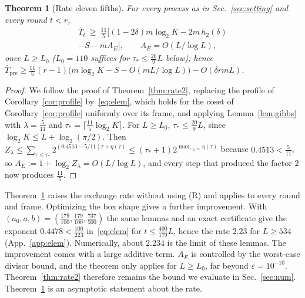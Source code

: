 \documentclass[aps,prx,twocolumn,superscriptaddress,nofootinbib,longbibliography]{revtex4-2}
\theoremstyle{plain}
\newtheorem{theorem}{Theorem}
\theoremstyle{definition}
\theoremstyle{remark}
\newcommand{\Tpre}{T_{\mathrm{pre}}}
\begin{document}
\begin{theorem}[Rate eleven fifths]\label{thm:rate115}
For every process as in Sec.~\ref{sec:setting} and every round $t<r$,
\begin{multline}\label{eq:rate115}
\bar T_t\ \ge\ \tfrac{11}5\big[(1-2\delta)m\log_2K-2m\,h_2(\delta)\\-S-mA_E\big],\qquad A_E=O(L/\log L),
\end{multline}
once $L\ge L_0$ ($L_0=110$ suffices for $\tau_*\le\tfrac{20}9L$ below); hence $\bar\Tpre\ge\tfrac{11}5(r-1)\big(m\log_2K-S-O(mL/\log L)\big)-O(\delta rmL)$.
\end{theorem}
\begin{proof}
We follow the proof of Theorem~\ref{thm:rate2}, replacing the profile of Corollary~\ref{cor:profile} by~\eqref{eq:elem}, which holds for the coset of Corollary~\ref{cor:profile} uniformly over its frame, and applying Lemma~\ref{lem:gibbs} with $\lambda=\tfrac5{11}$ and $\tau_*=\lceil\tfrac{11}5\log_2K\rceil$. For $L\ge L_0$, $\tau_*\le\tfrac{20}9L$, since $\log_2K\le L+\log_2(\pi/2)$. Then $Z_\lambda\le\sum_{\tau\le\tau_*}2^{(0.4513-5/11)\tau+\eta(\tau)}\le(\tau_*+1)2^{\max_{\tau\le\tau_*}\eta(\tau)}$ because $0.4513<\tfrac5{11}$, so $A_E:=1+\log_2Z_\lambda=O(L/\log L)$, and every step that produced the factor $2$ now produces $\tfrac{11}5$.
\end{proof}
Theorem~\ref{thm:rate115} raises the exchange rate without using (R) and applies to every round and frame. Optimizing the box shape gives a further improvement. With $(a_0,a,b)=(\tfrac{179}{100},\tfrac{179}{100},\tfrac{737}{500})$ the same lemmas and an exact certificate give the exponent $0.4478<\tfrac{100}{223}$ in~\eqref{eq:elem} for $t\le\tfrac{400}{179}L$, hence the rate $2.23$ for $L\ge534$ (App.~\ref{app:elem}). Numerically, about $2.234$ is the limit of these lemmas. The improvement comes with a large additive term. $A_E$ is controlled by the worst-case divisor bound, and the theorem only applies for $L\ge L_0$, far beyond $\varepsilon=10^{-10}$. Theorem~\ref{thm:rate2} therefore remains the bound we evaluate in Sec.~\ref{sec:num}. Theorem~\ref{thm:rate115} is an asymptotic statement about the rate.
\end{document}
